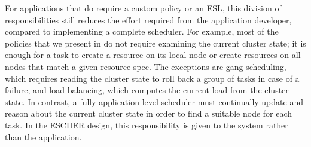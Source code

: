 For applications that do require a custom policy or an ESL, this division of responsibilities still reduces the effort required from the application developer, compared to implementing a complete scheduler.
For example, most of the policies that we present in  do not require examining the current cluster state; it is enough for a task to create a resource on its local node or create resources on all nodes that match a given resource spec.
The exceptions are gang scheduling, which requires reading the cluster state to roll back a group of tasks in case of a failure, and load-balancing, which computes the current load from the cluster state.
In contrast, a fully application-level scheduler must continually update and reason about the current cluster state in order to find a suitable node for each task.
In the ESCHER design, this responsibility is given to the system rather than the application.



